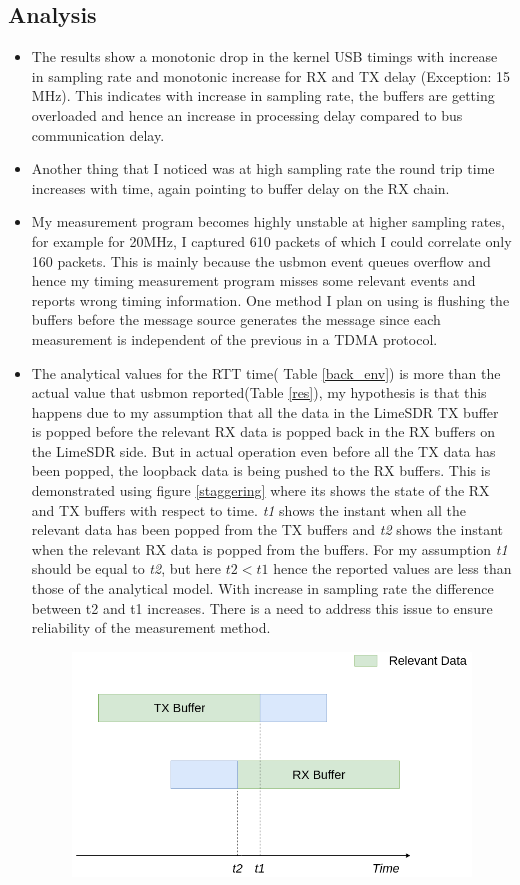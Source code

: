 \documentclass{kththesis}
\begin{document}
\subsection{Analysis}
\begin{itemize}
\item {The results show a monotonic drop in the kernel USB timings with increase in sampling rate and monotonic increase for RX and TX delay (Exception: 15 MHz). This indicates with increase in sampling rate, the buffers are getting overloaded and hence an increase in processing delay compared to bus communication delay.}
\item {Another thing that I noticed was at high sampling rate the round trip time increases with time, again pointing to buffer delay on the RX chain.}
\item {My measurement program becomes highly unstable at higher sampling rates, for example for 20MHz, I captured 610 packets of which I could correlate only 160 packets. This is mainly because the usbmon event queues overflow and hence my timing measurement program misses some relevant events and reports wrong timing information. One method I plan on using is flushing the buffers before the message source generates the message since each measurement is independent of the previous in a TDMA protocol.  }
\item {The analytical values for the RTT time( Table \ref{back_env}) is more than the actual value that usbmon reported(Table \ref{res}), my hypothesis is that this happens due to my assumption that all the data in the LimeSDR TX buffer is popped before the relevant RX data is popped back in the RX buffers on the LimeSDR side. But in actual operation even before all the TX data has been popped, the loopback data is being pushed to the RX buffers. This is demonstrated using figure \ref{staggering} where its shows the state of the RX and TX buffers with respect to time. \textit{t1} shows the instant when all the relevant data has been popped from the TX buffers and \textit{t2} shows the instant when the relevant RX data is popped from the buffers. For my assumption \textit{t1} should be equal to \textit{t2}, but here  $t2<t1$ hence the reported values are less than those of the analytical model. With increase in sampling rate the difference between t2 and t1 increases. There is a need to address this issue to ensure reliability of the measurement method.
\begin{figure}
\centering
\hspace{1cm}\includegraphics[scale=0.5]{Staggering.png}

\end{figure}}
\end{itemize}
\end{document}

